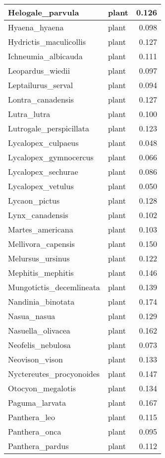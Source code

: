 \begin{table}
\begin{tabular}[t]{l|l|r}
\hline
Helogale\_parvula & plant & 0.126\\
\hline
Hyaena\_hyaena & plant & 0.098\\
\hline
Hydrictis\_maculicollis & plant & 0.127\\
\hline
Ichneumia\_albicauda & plant & 0.111\\
\hline
Leopardus\_wiedii & plant & 0.097\\
\hline
Leptailurus\_serval & plant & 0.094\\
\hline
Lontra\_canadensis & plant & 0.127\\
\hline
Lutra\_lutra & plant & 0.100\\
\hline
Lutrogale\_perspicillata & plant & 0.123\\
\hline
Lycalopex\_culpaeus & plant & 0.048\\
\hline
Lycalopex\_gymnocercus & plant & 0.066\\
\hline
Lycalopex\_sechurae & plant & 0.086\\
\hline
Lycalopex\_vetulus & plant & 0.050\\
\hline
Lycaon\_pictus & plant & 0.128\\
\hline
Lynx\_canadensis & plant & 0.102\\
\hline
Martes\_americana & plant & 0.103\\
\hline
Mellivora\_capensis & plant & 0.150\\
\hline
Melursus\_ursinus & plant & 0.122\\
\hline
Mephitis\_mephitis & plant & 0.146\\
\hline
Mungotictis\_decemlineata & plant & 0.139\\
\hline
Nandinia\_binotata & plant & 0.174\\
\hline
Nasua\_nasua & plant & 0.129\\
\hline
Nasuella\_olivacea & plant & 0.162\\
\hline
Neofelis\_nebulosa & plant & 0.073\\
\hline
Neovison\_vison & plant & 0.133\\
\hline
Nyctereutes\_procyonoides & plant & 0.147\\
\hline
Otocyon\_megalotis & plant & 0.134\\
\hline
Paguma\_larvata & plant & 0.167\\
\hline
Panthera\_leo & plant & 0.115\\
\hline
Panthera\_onca & plant & 0.095\\
\hline
Panthera\_pardus & plant & 0.112\\
\hline

\end{tabular}
\end{table}
